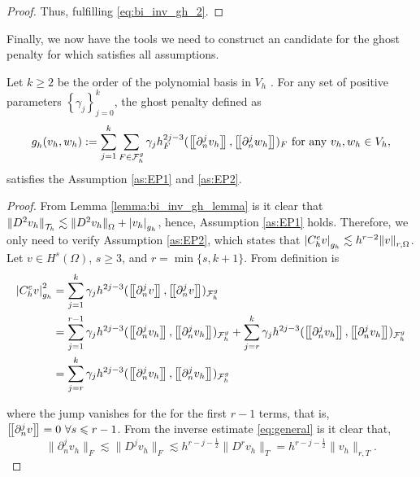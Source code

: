 \begin{proof}
        Thus, fulfilling \eqref{eq:bi_inv_gh_2}.


\end{proof}


Finally, we now have the tools we need to construct an candidate for the ghost penalty for which satisfies all assumptions.

\begin{proposition}
    Let $k\ge  2$ be the order of the polynomial basis in $V_{h}$ .
    For any set of positive parameters $\left\{ \gamma _{j} \right\} _{j=0}^{k}$, the ghost penalty defined as
    \begin{equation}
        \label{eq:ghost_penalty}
    g^{}_{h}( v_{h},w_{h})  := \sum_{j=1}^{k} \sum_{F \in \mathcal{F} _{h}^{g}}^{} \gamma _{j} h^{2j-3}_{F} ( \left[\!\left[  \partial ^{j}_{n} v_{h}  \right]\!\right], \left[\!\left[  \partial ^{j}_{n} w_{h}  \right]\!\right]  ) _{F} \text{ for any } v_{h},w_{h} \in V_{h},
    \end{equation}
    satisfies the Assumption \ref{as:EP1} and \ref{as:EP2}.
\end{proposition}

\begin{proof}
  From Lemma \ref{lemma:bi_inv_gh_lemma} is it clear that $
    \| D^2v_{h} \|_{ \mathcal{T} _{h} }^{  }  \lesssim \| D^2 v_{h} \|_{ \Omega   }^{  } + \left\lvert  v_{h}  \right\rvert _{g_{h}}
    $, hence, Assumption \ref{as:EP1} holds.
    Therefore, we only need to verify Assumption \ref{as:EP2}, which states that $ \left\lvert  C^{e}_{h} v  \right\rvert_{g_{h}} \lesssim h^{r-2} \| v \|_{r, \Omega   }^{  }$.
    Let $v  \in H^{s}( \Omega ) $, $s\ge 3$,  and $r = \min\{s,k+1\} $. From definition is \[
        \begin{split}
        \abs{ C^{e}_{h} v }_{g_{h}}^{2} & = \sum_{j=1}^{k}  \gamma _{j} h^{2j-3} ( \jump{ \partial ^{j}_{n} v }, \jump{ \partial ^{j}_{n} v }  ) _{\mathcal{F}_{h}^{g} } \\
& = \sum_{j=1}^{r-1}  \gamma _{j} h^{2j-3} ( \jump{ \partial ^{j}_{n} v_{h} }, \jump{ \partial ^{j}_{n} v_{h} }  ) _{\mathcal{F}_{h}^{g} } + \sum_{j=r}^{k}  \gamma _{j} h^{2j-3} ( \jump{ \partial ^{j}_{n} v_{h} }, \jump{ \partial ^{j}_{n} v_{h} }  ) _{\mathcal{F}_{h}^{g} } \\
&= \sum_{j=r}^{k}  \gamma _{j} h^{2j-3} ( \jump{ \partial ^{j}_{n} v_{h} }, \jump{ \partial ^{j}_{n} v_{h} }  ) _{\mathcal{F}_{h}^{g} } \\
        \end{split}
    \]

    where the jump vanishes for the for the first $r-1$ terms, that is,  $\left[\!\left[  \partial ^{j}_{n} v  \right]\!\right] = 0  \  \forall s \leqslant r-1$.
    From the inverse estimate \eqref{eq:general} is it clear that,
    \begin{equation}
        \| \partial _{n}^{j}v_{h} \|_{ F }^{  } \lesssim \| D^{j}v_{h} \|_{ F }^{  } \lesssim h^{r- j - \frac{1}{2}}\| D^{r}v_{h} \|_{  T}^{  } = h^{r- j - \frac{1}{2}} \| v_{h} \|_{r, T  }^{  }   .
    \end{equation}


\end{proof}
